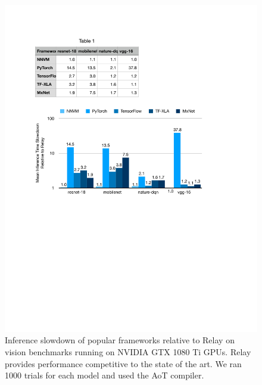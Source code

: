   \begin{figure}[h]
    \includegraphics[width=
    \textwidth]{fig_splash19/eval/vision_1080Ti_relay.pdf}
    \caption{
      Inference slowdown of popular frameworks relative to Relay on vision
        benchmarks running on NVIDIA GTX 1080 Ti GPUs.
      Relay provides performance competitive to the state of the art.
      We ran 1000 trials for each model and used the AoT compiler.
    }
    \label{fig:vision-eval}
  \end{figure}


